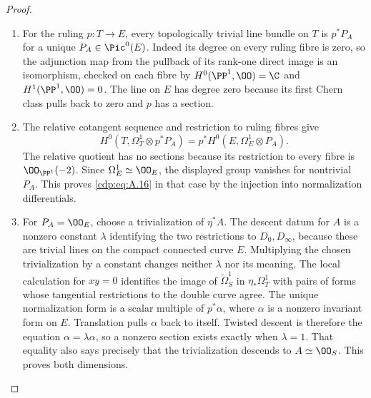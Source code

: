 \begin{proof}

\begin{enumerate}[label={$\langle1\rangle$\arabic*.},leftmargin=*]
\item For the ruling $p:T\to E$, every topologically trivial line bundle on $T$ is $p^*P_A$ for a unique $P_A\in\Pic^0(E)$. Indeed its degree on every ruling fibre is zero, so the adjunction map from the pullback of its rank-one direct image is an isomorphism, checked on each fibre by $H^0(\PP^1,\OO)=\C$ and $H^1(\PP^1,\OO)=0$. The line on $E$ has degree zero because its first Chern class pulls back to zero and $p$ has a section.

\item The relative cotangent sequence and restriction to ruling fibres give
\[
 H^0(T,\Omega_T^1\otimes p^*P_A)
 =p^*H^0(E,\Omega_E^1\otimes P_A).
\]
The relative quotient has no sections because its restriction to every fibre is $\OO_{\PP^1}(-2)$. Since $\Omega_E^1\simeq\OO_E$, the displayed group vanishes for nontrivial $P_A$. This proves \eqref{cdp:eq:A.16} in that case by the injection into normalization differentials.

\item For $P_A=\OO_E$, choose a trivialization of $\eta^*A$. The descent datum for $A$ is a nonzero constant $\lambda$ identifying the two restrictions to $D_0,D_\infty$, because these are trivial lines on the compact connected curve $E$. Multiplying the chosen trivialization by a constant changes neither $\lambda$ nor its meaning. The local calculation for $xy=0$ identifies the image of $\widetilde\Omega_S^1$ in $\eta_*\Omega_T^1$ with pairs of forms whose tangential restrictions to the double curve agree. The unique normalization form is a scalar multiple of $p^*\alpha$, where $\alpha$ is a nonzero invariant form on $E$. Translation pulls $\alpha$ back to itself. Twisted descent is therefore the equation $\alpha=\lambda\alpha$, so a nonzero section exists exactly when $\lambda=1$. That equality also says precisely that the trivialization descends to $A\simeq\OO_S$. This proves both dimensions.

\end{enumerate}
\end{proof}
